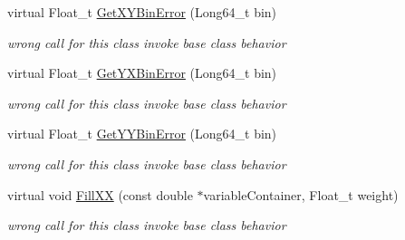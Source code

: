 \begin{DoxyCompactItemize}
virtual Float\+\_\+t \mbox{\hyperlink{classQn_1_1CorrectionProfileCorrelationComponentsHarmonics_a4dbf495bfa861a2cf2a59182271c43a9}{Get\+X\+Y\+Bin\+Error}} (Long64\+\_\+t bin)
\begin{DoxyCompactList}\small\item\em wrong call for this class invoke base class behavior \end{DoxyCompactList}\item 
\mbox{\label{classQn_1_1CorrectionProfileCorrelationComponentsHarmonics_a2fb45faa92d49c538af35235ced49240}} 
virtual Float\+\_\+t \mbox{\hyperlink{classQn_1_1CorrectionProfileCorrelationComponentsHarmonics_a2fb45faa92d49c538af35235ced49240}{Get\+Y\+X\+Bin\+Error}} (Long64\+\_\+t bin)
\begin{DoxyCompactList}\small\item\em wrong call for this class invoke base class behavior \end{DoxyCompactList}\item 
\mbox{\label{classQn_1_1CorrectionProfileCorrelationComponentsHarmonics_a2c790c78673796616e18bc1f793a6f1e}} 
virtual Float\+\_\+t \mbox{\hyperlink{classQn_1_1CorrectionProfileCorrelationComponentsHarmonics_a2c790c78673796616e18bc1f793a6f1e}{Get\+Y\+Y\+Bin\+Error}} (Long64\+\_\+t bin)
\begin{DoxyCompactList}\small\item\em wrong call for this class invoke base class behavior \end{DoxyCompactList}\item 
\mbox{\label{classQn_1_1CorrectionProfileCorrelationComponentsHarmonics_a631174884439d99dee2d04678d1e64aa}} 
virtual void \mbox{\hyperlink{classQn_1_1CorrectionProfileCorrelationComponentsHarmonics_a631174884439d99dee2d04678d1e64aa}{Fill\+XX}} (const double $\ast$variable\+Container, Float\+\_\+t weight)
\begin{DoxyCompactList}\small\item\em wrong call for this class invoke base class behavior \end{DoxyCompactList}\item 
\mbox{\label{classQn_1_1CorrectionProfileCorrelationComponentsHarmonics_a59fc7f772621466f60cbf34a98c0174c}} 

\end{DoxyCompactItemize}
